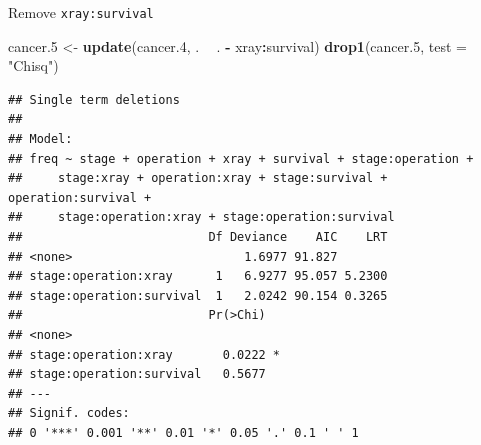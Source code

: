 \documentclass[ignorenonframetext,]{beamer}
\newenvironment{Shaded}{\begin{snugshade}}{\end{snugshade}}
\newcommand{\DataTypeTok}[1]{\textcolor[rgb]{0.13,0.29,0.53}{#1}}
\newcommand{\FloatTok}[1]{\textcolor[rgb]{0.00,0.00,0.81}{#1}}
\newcommand{\KeywordTok}[1]{\textcolor[rgb]{0.13,0.29,0.53}{\textbf{#1}}}
\newcommand{\NormalTok}[1]{#1}
\newcommand{\OperatorTok}[1]{\textcolor[rgb]{0.81,0.36,0.00}{\textbf{#1}}}
\newcommand{\StringTok}[1]{\textcolor[rgb]{0.31,0.60,0.02}{#1}}
\begin{document}
\begin{frame}[fragile]{Remove \texttt{xray:survival}}
\protect\hypertarget{remove-xraysurvival}{}

\begin{Shaded}
\begin{Highlighting}[]
\NormalTok{cancer}\FloatTok{.5}\NormalTok{ <-}\StringTok{ }\KeywordTok{update}\NormalTok{(cancer}\FloatTok{.4}\NormalTok{, . }\OperatorTok{~}\StringTok{ }\NormalTok{. }\OperatorTok{-}\StringTok{ }\NormalTok{xray}\OperatorTok{:}\NormalTok{survival)}
\KeywordTok{drop1}\NormalTok{(cancer}\FloatTok{.5}\NormalTok{, }\DataTypeTok{test =} \StringTok{"Chisq"}\NormalTok{)}
\end{Highlighting}
\end{Shaded}

\begin{verbatim}
## Single term deletions
## 
## Model:
## freq ~ stage + operation + xray + survival + stage:operation + 
##     stage:xray + operation:xray + stage:survival + operation:survival + 
##     stage:operation:xray + stage:operation:survival
##                          Df Deviance    AIC    LRT
## <none>                        1.6977 91.827       
## stage:operation:xray      1   6.9277 95.057 5.2300
## stage:operation:survival  1   2.0242 90.154 0.3265
##                          Pr(>Chi)  
## <none>                             
## stage:operation:xray       0.0222 *
## stage:operation:survival   0.5677  
## ---
## Signif. codes:  
## 0 '***' 0.001 '**' 0.01 '*' 0.05 '.' 0.1 ' ' 1
\end{verbatim}

\end{frame}
\end{document}
